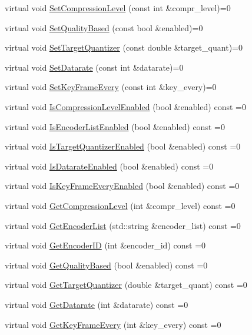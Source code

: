 \begin{DoxyCompactItemize}
\item 
virtual void \hyperlink{classsvl_video_codec_base_ab99462517e534e67543afffb9a480d48}{Set\+Compression\+Level} (const int \&compr\+\_\+level)=0
\item 
virtual void \hyperlink{classsvl_video_codec_base_a5f5d5e0cecb6ccc0476881ad7670c0c1}{Set\+Quality\+Based} (const bool \&enabled)=0
\item 
virtual void \hyperlink{classsvl_video_codec_base_a2dac9b04bd4419461cd38daa8b79a3f8}{Set\+Target\+Quantizer} (const double \&target\+\_\+quant)=0
\item 
virtual void \hyperlink{classsvl_video_codec_base_a3d9f11e00f6cbf4c52c48a78eee46447}{Set\+Datarate} (const int \&datarate)=0
\item 
virtual void \hyperlink{classsvl_video_codec_base_af04b2bd0d9f2b50347594721ee5a422b}{Set\+Key\+Frame\+Every} (const int \&key\+\_\+every)=0
\item 
virtual void \hyperlink{classsvl_video_codec_base_a93fb132b4fa598b9a7d3907b9efc2c73}{Is\+Compression\+Level\+Enabled} (bool \&enabled) const =0
\item 
virtual void \hyperlink{classsvl_video_codec_base_a771977764177e399e89b14f56415da6f}{Is\+Encoder\+List\+Enabled} (bool \&enabled) const =0
\item 
virtual void \hyperlink{classsvl_video_codec_base_a36919a662a2287bbc2855d0c0240a606}{Is\+Target\+Quantizer\+Enabled} (bool \&enabled) const =0
\item 
virtual void \hyperlink{classsvl_video_codec_base_a53d56c6b38a7341e83569de442ade7ad}{Is\+Datarate\+Enabled} (bool \&enabled) const =0
\item 
virtual void \hyperlink{classsvl_video_codec_base_a5c0479c4e6d0bc413b7a0a55ec85caa9}{Is\+Key\+Frame\+Every\+Enabled} (bool \&enabled) const =0
\item 
virtual void \hyperlink{classsvl_video_codec_base_ad4c5251087b9025915eb8de426a6f485}{Get\+Compression\+Level} (int \&compr\+\_\+level) const =0
\item 
virtual void \hyperlink{classsvl_video_codec_base_a359299dd727f4db9efebfa3b4ef95ca4}{Get\+Encoder\+List} (std\+::string \&encoder\+\_\+list) const =0
\item 
virtual void \hyperlink{classsvl_video_codec_base_aa7ce7adc80d611e6ee578d29fd0d4f3f}{Get\+Encoder\+I\+D} (int \&encoder\+\_\+id) const =0
\item 
virtual void \hyperlink{classsvl_video_codec_base_a7b6e98c1f2c0a19fd985de9ee2e28467}{Get\+Quality\+Based} (bool \&enabled) const =0
\item 
virtual void \hyperlink{classsvl_video_codec_base_a7707749fdc3d035b8e203f971694940e}{Get\+Target\+Quantizer} (double \&target\+\_\+quant) const =0
\item 
virtual void \hyperlink{classsvl_video_codec_base_a1034d3bb8ea93ac797a1539e79e5a0b7}{Get\+Datarate} (int \&datarate) const =0
\item 
virtual void \hyperlink{classsvl_video_codec_base_adfe0dd7da14804c042fc5b080ba186f0}{Get\+Key\+Frame\+Every} (int \&key\+\_\+every) const =0
\end{DoxyCompactItemize}
